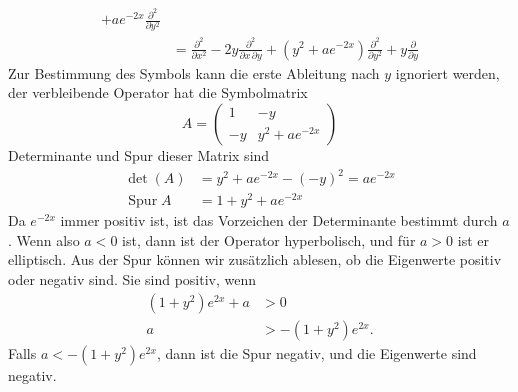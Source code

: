 \begin{loesung}
\begin{align*}
+ae^{-2x}\frac{\partial^2}{\partial y^2}
\\
&=
\frac{\partial^2}{\partial x^2} - 2y\frac{\partial^2}{\partial x\,\partial y}
+(y^2+ae^{-2x})\frac{\partial^2}{\partial y^2}+y\frac{\partial}{\partial y}
\end{align*}
Zur Bestimmung des Symbols kann die erste Ableitung nach $y$ ignoriert werden,
der verbleibende Operator hat die Symbolmatrix
\[
A=\begin{pmatrix}
1&-y\\
-y&y^2+ae^{-2x}
\end{pmatrix}
\]
Determinante und Spur dieser Matrix sind
\begin{align*}
\det(A) &= y^2+ae^{-2x}-(-y)^2=ae^{-2x}
\\
\operatorname{Spur}A&=1+y^2+ae^{-2x}
\end{align*}
Da $e^{-2x}$ immer positiv ist, ist das Vorzeichen der Determinante bestimmt
durch $a$.
Wenn also $a<0$ ist, dann ist der Operator hyperbolisch, und für $a>0$
ist er elliptisch.
Aus der Spur können wir zusätzlich ablesen, ob die Eigenwerte positiv
oder negativ sind.
Sie sind positiv, wenn 
\begin{align*}
(1+y^2)e^{2x}+a&>0
\\
a &> -(1+y^2)e^{2x}.
\end{align*}
Falls $a < -(1+y^2)e^{2x}$, dann ist die Spur negativ, und die Eigenwerte
sind negativ.
\end{loesung}



